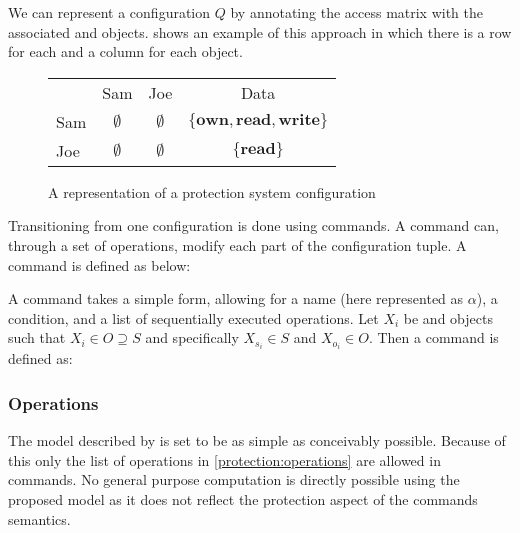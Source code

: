 We can represent a configuration $Q$ by annotating the access matrix with the associated \subjects{} and objects.
 shows an example of this approach in which there is a row for each \ssubject{} and a column for each object.

\begin{figure}[h]
\centering
\begin{tabular}{l|c|c|c|}
\multicolumn{1}{c}{} & \multicolumn{1}{c}{Sam} & \multicolumn{1}{c}{Joe} & \multicolumn{1}{c}{Data} \\\cline{2-4}
Sam & $\emptyset$ & $\emptyset$ & $\{\textbf{own}, \textbf{read}, \textbf{write}\}$ \\\cline{2-4}
Joe & $\emptyset$ & $\emptyset$ & $\{\textbf{read}\}$ \\\cline{2-4}
\end{tabular}
\caption{A representation of a protection system configuration}
\label{protection:matrixsmall}
\end{figure}

Transitioning from one configuration is done using commands.
A command can, through a set of operations, modify each part of the configuration tuple.
A command is defined as below:

\begin{definition}
A command takes a simple form, allowing for a name (here represented as $\alpha$), a condition, and a list of sequentially executed operations.
Let $X_i$ be \subjects{} and objects such that $X_i \in O \supseteq S$ and specifically $X_{s_i} \in S$ and $X_{o_i} \in O$.
Then a command is defined as:
\begin{algorithm}[H]
  \DontPrintSemicolon
  \cmd {} 
\end{algorithm}
\end{definition}

\subsubsection{Operations}
The model described by \citet{HRU} is set to be as simple as conceivably possible.
Because of this only the list of operations in \cref{protection:operations} are allowed in commands.
No general purpose computation is directly possible using the proposed model as it does not reflect the protection aspect of the commands semantics.

